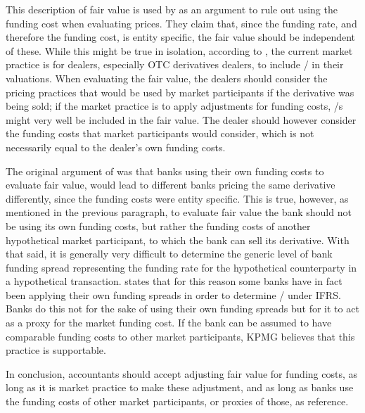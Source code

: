 \documentclass[main.tex]{subfiles}
\begin{document}
            This description of fair value is used by \textcite{HullWhiteFVA} as an argument to
            rule out using the funding cost when evaluating prices.
            They claim that, since the funding rate, and therefore the funding cost, is entity specific,
            the fair value should be independent of these.
            While this might be true in isolation, 
            according to \textcite{KPMGFVA}, the current market practice is for dealers, 
            especially OTC derivatives dealers, to include \FVA/ in their valuations.  
            When evaluating the fair value, the dealers should consider the pricing practices 
            that would be used by market participants if the derivative was being sold;
            if the market practice is to apply adjustments for funding costs,
            \FVA/s might very well be included in the fair value.
            The dealer should however consider the funding costs that market participants would consider,
            which is not necessarily equal to the dealer's own funding costs.

            The original argument of \textcite{HullWhiteFVA} was that banks using their own funding costs to evaluate fair value,
            would lead to different banks pricing the same derivative differently,
            since the funding costs were entity specific.
            This is true, however, as mentioned in the previous paragraph,
            to evaluate fair value the bank should not be using its own funding costs, 
            but rather the funding costs of another hypothetical market participant, 
            to which the bank can sell its derivative.
            With that said, it is generally very difficult to determine the generic level of bank funding spread
            representing the funding rate for the hypothetical counterparty in a hypothetical transaction.
            \textcite[Proposition 4]{KPMGFVA} states that for this reason 
            some banks have in fact been applying their own funding spreads in order to determine \FVA/ under IFRS. 
            Banks do this not for the sake of using their own funding spreads
            but for it to act as a proxy for the market funding cost.
            If the bank can be assumed to have comparable funding costs to other market participants,
            KPMG believes that this practice is supportable.

            In conclusion, accountants should accept adjusting fair value for funding costs,
            as long as it is market practice to make these adjustment,
            and as long as banks use the funding costs of other market participants, 
            or proxies of those, as reference.
\end{document}
